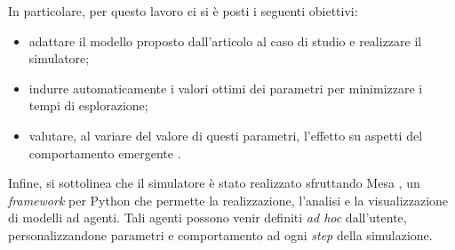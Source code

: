 In particolare, per questo lavoro ci si è posti i seguenti obiettivi:\begin{itemize}
	\item adattare il modello proposto dall'articolo al caso di studio e realizzare il simulatore;
	\item indurre automaticamente i valori ottimi dei parametri per minimizzare i tempi di esplorazione;
	\item valutare, al variare del valore di questi parametri, l'effetto su aspetti del comportamento emergente .
\end{itemize}
Infine, si sottolinea che il simulatore è stato realizzato sfruttando Mesa \cite{Mesa}, un \textit{framework} per Python che permette la realizzazione, l'analisi e la visualizzazione di modelli ad agenti. Tali agenti possono venir definiti \textit{ad hoc} dall'utente, personalizzandone parametri e comportamento ad ogni \textit{step} della simulazione.